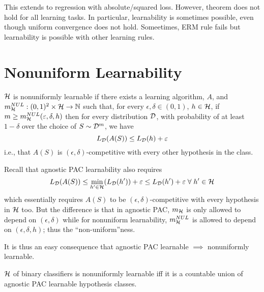 \documentclass[a4paper, 10pt]{article}
\begin{document}
    \begin{remark}
    This extends to regression with absolute/squared loss. However, theorem does not hold for all learning tasks. In particular, learnability is sometimes possible, even though uniform convergence does not hold. Someetimes, ERM rule fails but learnability is possible with other learning rules.
    \end{remark}

    \section{Nonuniform Learnability}
    \begin{definition} 
    $\mathcal{H}$ is nonuniformly learnable if there exists a learning algorithm, $A$, and $m_{\mathcal{H}}^{NUL}: (0, 1)^2 \times \mathcal{H} \to \mathbb{N}$ such that, for every $\epsilon, \delta \in (0, 1)$, $h \in \mathcal{H}$, if $m \geq m_{\mathcal{H}}^{NUL}(\varepsilon, \delta, h)$ then for every distribution $\mathcal{D}$, with probability of at least $1 - \delta$ over the choice of $S \sim \mathcal{D}^m$, we have \begin{equation*}
    L_{\mathcal{D}} (A(S)) \leq L_{\mathcal{D}} (h) + \varepsilon
    \end{equation*}
    i.e., that $A(S)$ is $(\epsilon, \delta)$-competitive with every other hypothesis in the class.
    \end{definition}

    \begin{remark}
    Recall that agnostic PAC learnability also requires \begin{equation*}
    L_\cald (A(S)) \leq \min_{h' \in \calh}(L_\cald(h')) + \epsilon \leq L_\cald(h') + \epsilon \forall h' \in \calh
    \end{equation*}
    which essentially requires $A(S)$ to be $(\epsilon, \delta)$-competitive with every hypothesis in $\mathcal{H}$ too. But the difference is that in agnostic PAC, $m_{\mathcal{H}}$   is only allowed to depend on $(\epsilon, \delta)$ while for nonuniform learnability, $m_{\mathcal{H}}^{NUL}$ is allowed to depend on $(\epsilon, \delta, h)$; thus the ``non-uniform''ness.

    It is thus an easy consequence that agnostic PAC learnable $\implies$ nonuniformly learnable.
    \end{remark}

    \begin{theorem}
    $\mathcal{H}$ of binary classifiers is nonuniformly learnable iff it is a countable union of agnostic PAC learnable hypothesis classes.
    \end{theorem}
\end{document}
